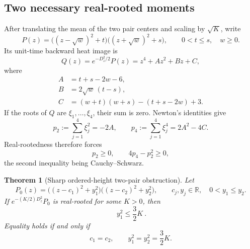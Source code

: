 \documentclass[11pt]{article}
\newtheorem{theorem}{Theorem}[section]
\theoremstyle{definition}
\theoremstyle{remark}
\begin{document}
\subsection{Two necessary real-rooted moments}

After translating the mean of the two pair centers and scaling by
\(\sqrt K\), write
\[
 P(z)=\bigl((z-\sqrt w)^2+t\bigr)
      \bigl((z+\sqrt w)^2+s\bigr),
 \qquad 0<t\le s,\quad w\ge0.
 \tag{N8.1}
\]
Its unit-time backward heat image is
\[
 Q(z)=e^{-D_z^2/2}P(z)=z^4+Az^2+Bz+C,
 \tag{N8.2}
\]
where
\[
\begin{aligned}
 A&=t+s-2w-6,\\
 B&=2\sqrt w\,(t-s),\\
 C&=(w+t)(w+s)-(t+s-2w)+3.
\end{aligned}
\tag{N8.3}
\]
If the roots of \(Q\) are \(\xi_1,\ldots,\xi_4\), their sum is zero.
Newton's identities give
\[
 p_2:=\sum_{j=1}^4\xi_j^2=-2A,\qquad
 p_4:=\sum_{j=1}^4\xi_j^4=2A^2-4C.
 \tag{N8.4}
\]
Real-rootedness therefore forces
\[
 p_2\ge0,\qquad
 4p_4-p_2^2\ge0,
 \tag{N8.5}
\]
the second inequality being Cauchy--Schwarz.

\begin{theorem}[Sharp ordered-height two-pair obstruction]
\label{thm:f2v8-ordered}
Let
\[
 P_0(z)=
 \bigl((z-c_1)^2+y_1^2\bigr)
 \bigl((z-c_2)^2+y_2^2\bigr),
 \qquad c_j,y_j\in\mathbb R,\quad 0<y_1\le y_2.
 \tag{N8.6}
\]
If \(e^{-(K/2)D_z^2}P_0\) is real-rooted for some \(K>0\), then
\[
 \boxed{\ y_1^2\le\frac32K\ }.
 \tag{N8.7}
\]
Equality holds if and only if
\[
 c_1=c_2,\qquad
 y_1^2=y_2^2=\frac32K.
 \tag{N8.8}
\]
\end{theorem}
\end{document}
